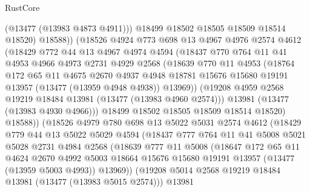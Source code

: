 \begin{lexlean}{RustCore}
\begin{coremodule}
                  (@13477 (@13983 @4873 @4911)))
                @18499
                @18502
                @18505
                @18509
                @18514
                @18520)
              @18588))
          (@18526
            @4924
            @773
            @698
            @13
            @4967
            @4976
            @2574
            @4612
            (@18429
              @772
              @44
              @13
              @4967
              @4974
              @4594
              (@18437
                @770
                @764
                @11
                @41
                @4953
                @4966
                @4973
                @2731
                @4929
                @2568
                (@18639
                  @770
                  @11
                  @4953
                  (@18764
                    @172
                    @65
                    @11
                    @4675
                    @2670
                    @4937
                    @4948
                    @18781
                    @15676
                    @15680
                    @19191
                    @13957
                    (@13477 (@13959 @4948 @4938))
                    @13969))
                (@19208 @4959 @2568 @19219 @18484 @13981 (@13477 (@13983 @4960 @2574)))
                @13981
                (@13477 (@13983 @4930 @4966)))
              @18499
              @18502
              @18505
              @18509
              @18514
              @18520)
            @18588))
        (@18526
          @4979
          @780
          @698
          @13
          @5022
          @5031
          @2574
          @4612
          (@18429
            @779
            @44
            @13
            @5022
            @5029
            @4594
            (@18437
              @777
              @764
              @11
              @41
              @5008
              @5021
              @5028
              @2731
              @4984
              @2568
              (@18639
                @777
                @11
                @5008
                (@18647
                  @172
                  @65
                  @11
                  @4624
                  @2670
                  @4992
                  @5003
                  @18664
                  @15676
                  @15680
                  @19191
                  @13957
                  (@13477 (@13959 @5003 @4993))
                  @13969))
              (@19208 @5014 @2568 @19219 @18484 @13981 (@13477 (@13983 @5015 @2574)))
              @13981

\end{coremodule}
\end{lexlean}
